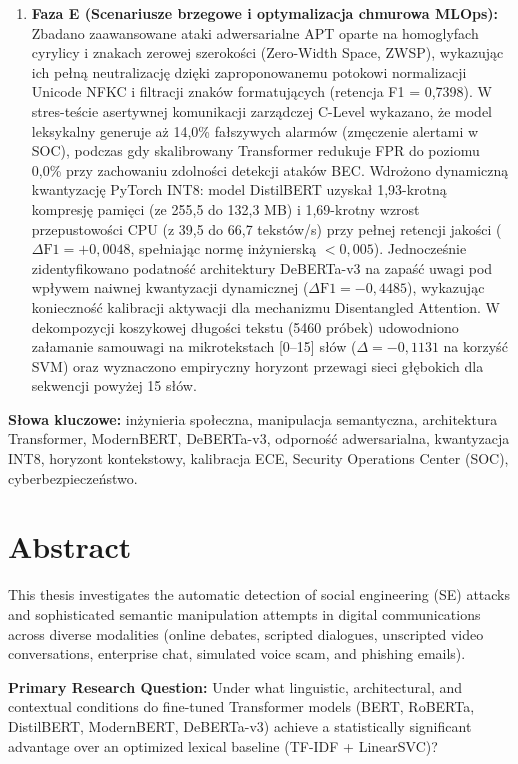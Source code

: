 \documentclass[12pt,a4paper,twoside]{report}
\begin{document}
\begin{enumerate}[leftmargin=*]
  \item \textbf{Faza E (Scenariusze brzegowe i optymalizacja chmurowa MLOps):} Zbadano zaawansowane ataki adwersarialne APT oparte na homoglyfach cyrylicy i znakach zerowej szerokości (Zero-Width Space, ZWSP), wykazując ich pełną neutralizację dzięki zaproponowanemu potokowi normalizacji Unicode NFKC i filtracji znaków formatujących (retencja F1 = 0,7398). W stres-teście asertywnej komunikacji zarządczej C-Level wykazano, że model leksykalny generuje aż 14,0\% fałszywych alarmów (zmęczenie alertami w SOC), podczas gdy skalibrowany Transformer redukuje FPR do poziomu 0,0\% przy zachowaniu zdolności detekcji ataków BEC. Wdrożono dynamiczną kwantyzację PyTorch INT8: model DistilBERT uzyskał 1,93-krotną kompresję pamięci (ze 255,5 do 132,3 MB) i 1,69-krotny wzrost przepustowości CPU (z 39,5 do 66,7 tekstów/s) przy pełnej retencji jakości ($\Delta\text{F1} = +0,0048$, spełniając normę inżynierską $<0,005$). Jednocześnie zidentyfikowano podatność architektury DeBERTa-v3 na zapaść uwagi pod wpływem naiwnej kwantyzacji dynamicznej ($\Delta\text{F1} = -0,4485$), wykazując konieczność kalibracji aktywacji dla mechanizmu Disentangled Attention. W dekompozycji koszykowej długości tekstu (5460 próbek) udowodniono załamanie samouwagi na mikrotekstach [0--15] słów ($\Delta = -0,1131$ na korzyść SVM) oraz wyznaczono empiryczny horyzont przewagi sieci głębokich dla sekwencji powyżej 15 słów.
\end{enumerate}

\noindent\textbf{Słowa kluczowe:}
inżynieria społeczna, manipulacja semantyczna, architektura Transformer, ModernBERT, DeBERTa-v3, odporność adwersarialna, kwantyzacja INT8, horyzont kontekstowy, kalibracja ECE, Security Operations Center (SOC), cyberbezpieczeństwo.

\newpage
\chapter*{Abstract}
This thesis investigates the automatic detection of social engineering (SE) attacks and sophisticated semantic manipulation attempts in digital communications across diverse modalities (online debates, scripted dialogues, unscripted video conversations, enterprise chat, simulated voice scam, and phishing emails).

\textbf{Primary Research Question:} Under what linguistic, architectural, and contextual conditions do fine-tuned Transformer models (BERT, RoBERTa, DistilBERT, ModernBERT, DeBERTa-v3) achieve a statistically significant advantage over an optimized lexical baseline (TF-IDF + LinearSVC)?
\end{document}
